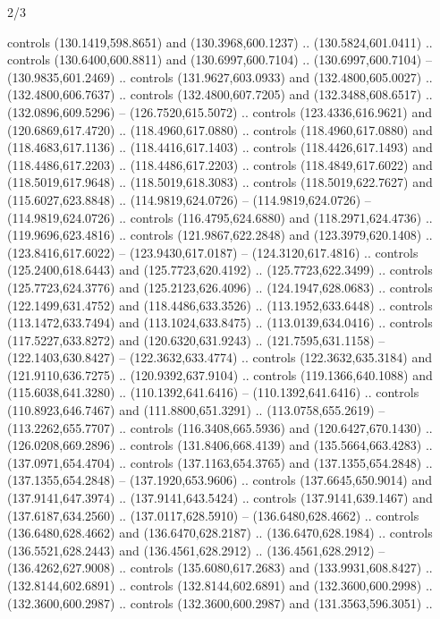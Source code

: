 \begin{flagdescription}{2/3}
\begin{scope}[xshift=0.5\flaglength,yshift=0.5\flagwidth,scale=\flagwidth/525.28]
\begin{scope}[y=0.1mm, x=0.1mm, yscale=-1,shift={(-381.5,-404)}]
\begin{scope}[shift={(5.25001,4.53053)},miter limit=4.00,line width=0.800\lw]
  controls (130.1419,598.8651) and (130.3968,600.1237) .. (130.5824,601.0411) ..
  controls (130.6400,600.8811) and (130.6997,600.7104) .. (130.6997,600.7104) --
  (130.9835,601.2469) .. controls (131.9627,603.0933) and (132.4800,605.0027) ..
  (132.4800,606.7637) .. controls (132.4800,607.7205) and (132.3488,608.6517) ..
  (132.0896,609.5296) -- (126.7520,615.5072) .. controls (123.4336,616.9621) and
  (120.6869,617.4720) .. (118.4960,617.0880) .. controls (118.4960,617.0880) and
  (118.4683,617.1136) .. (118.4416,617.1403) .. controls (118.4426,617.1493) and
  (118.4486,617.2203) .. (118.4486,617.2203) .. controls (118.4849,617.6022) and
  (118.5019,617.9648) .. (118.5019,618.3083) .. controls (118.5019,622.7627) and
  (115.6027,623.8848) .. (114.9819,624.0726) -- (114.9819,624.0726) --
  (114.9819,624.0726) .. controls (116.4795,624.6880) and (118.2971,624.4736) ..
  (119.9696,623.4816) .. controls (121.9867,622.2848) and (123.3979,620.1408) ..
  (123.8416,617.6022) -- (123.9430,617.0187) -- (124.3120,617.4816) .. controls
  (125.2400,618.6443) and (125.7723,620.4192) .. (125.7723,622.3499) .. controls
  (125.7723,624.3776) and (125.2123,626.4096) .. (124.1947,628.0683) .. controls
  (122.1499,631.4752) and (118.4486,633.3526) .. (113.1952,633.6448) .. controls
  (113.1472,633.7494) and (113.1024,633.8475) .. (113.0139,634.0416) .. controls
  (117.5227,633.8272) and (120.6320,631.9243) .. (121.7595,631.1158) --
  (122.1403,630.8427) -- (122.3632,633.4774) .. controls (122.3632,635.3184) and
  (121.9110,636.7275) .. (120.9392,637.9104) .. controls (119.1366,640.1088) and
  (115.6038,641.3280) .. (110.1392,641.6416) -- (110.1392,641.6416) .. controls
  (110.8923,646.7467) and (111.8800,651.3291) .. (113.0758,655.2619) --
  (113.2262,655.7707) .. controls (116.3408,665.5936) and (120.6427,670.1430) ..
  (126.0208,669.2896) .. controls (131.8406,668.4139) and (135.5664,663.4283) ..
  (137.0971,654.4704) .. controls (137.1163,654.3765) and (137.1355,654.2848) ..
  (137.1355,654.2848) -- (137.1920,653.9606) .. controls (137.6645,650.9014) and
  (137.9141,647.3974) .. (137.9141,643.5424) .. controls (137.9141,639.1467) and
  (137.6187,634.2560) .. (137.0117,628.5910) -- (136.6480,628.4662) .. controls
  (136.6480,628.4662) and (136.6470,628.2187) .. (136.6470,628.1984) .. controls
  (136.5521,628.2443) and (136.4561,628.2912) .. (136.4561,628.2912) --
  (136.4262,627.9008) .. controls (135.6080,617.2683) and (133.9931,608.8427) ..
  (132.8144,602.6891) .. controls (132.8144,602.6891) and (132.3600,600.2998) ..
  (132.3600,600.2987) .. controls (132.3600,600.2987) and (131.3563,596.3051) ..

\end{scope}
\end{scope}
\end{scope}
\end{flagdescription}
